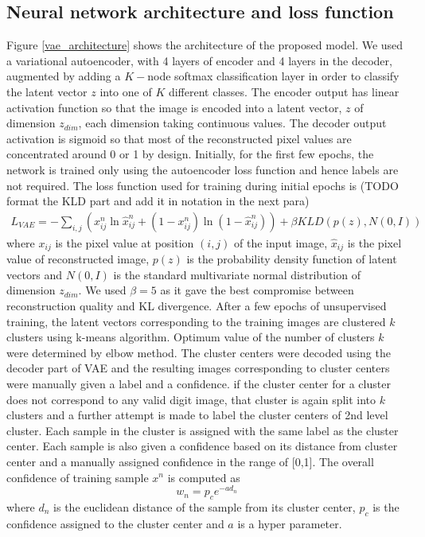 \documentclass{uai2021} %
\begin{document}
\subsection{Neural network architecture and loss function}
Figure \ref{vae_architecture} shows the architecture of the proposed model.
We used a variational autoencoder\cite{kingma2013auto}, with 4 layers of encoder and 4 layers in the decoder, augmented by adding a $K-$node softmax classification layer in order to classify the latent vector $z$ into one of $K$ different classes.
The encoder output has linear activation function so that the image is encoded into a latent vector, $z$  of dimension $z_{dim}$, each dimension taking continuous values.
The decoder output activation is sigmoid so that most of the reconstructed pixel values  are concentrated around 0 or 1 by design.
Initially, for the first few epochs, the network is trained only using the autoencoder loss function and hence labels are not required.
The loss function used for training during initial epochs is (TODO format the KLD part and add it in notation in the next para)
\begin{multline}
L_{VAE} = -\sum_{i, j}(x_{ij}^n \ln \hat{x}_{ij}^n
+ (1 - x_{ij}^n) \ln(1 -  \hat{x}_{ij}^n ) )
    +\beta KLD(p(z), N(0,I))
\end{multline}
where   $x_{ij}$ is the pixel value at position $(i, j)$ of the input image, $\hat{x}_{ij}$ is the pixel value of reconstructed image, $p(z)$ is the probability density function of latent vectors and $N(0,I)$ is the standard multivariate normal distribution of dimension $z_{dim}$.
We used $\beta = 5$ as it gave the best compromise between reconstruction quality and KL divergence.
After a few epochs of unsupervised training, the latent vectors corresponding to the training images are clustered $k$ clusters using k-means algorithm.
Optimum value of the number of clusters $k$ were determined by elbow method.
The cluster centers were decoded using the decoder part of VAE and the resulting images corresponding to cluster centers were manually given a label and a confidence.
if the cluster center for a cluster does not correspond to any valid digit image, that cluster is again split into $k$ clusters and a further attempt is made to label the cluster centers of 2nd level cluster.
Each sample in the cluster is assigned with the  same label as the cluster center.
Each sample is also given a confidence based on its distance from cluster center and  a manually assigned confidence in the range of [0,1].
The overall confidence of  training sample $x^n$ is computed as
\begin{equation}
w_n = p_ce^{-a d_n}
\end{equation}
where $d_n$ is the euclidean distance of the sample from its cluster center, $p_c$  is the confidence assigned to the cluster center and $a$ is a hyper parameter.
\end{document}
